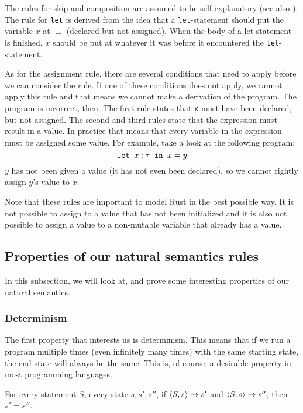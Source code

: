 The rules for skip and composition are assumed to be self-explanatory (see also \cite{nielson1992semantics}). The rule for \texttt{let} is derived from the idea that a \texttt{let}-statement should put the variable $x$ at $\perp$ (declared but not assigned). When the body of a let-statement is finished, $x$ should be put at whatever it was before it encountered the \texttt{let}-statement. 

As for the assignment rule, there are several conditions that need to apply before we can consider the rule. If one of these conditions does not apply, we cannot apply this rule and that means we cannot make a derivation of the program. The program is incorrect, then. The first rule states that \verb|x| must have been declared, but not assigned. The second and third rules state that the expression must result in a value. In practice that means that every variable in the expression must be assigned some value. 
For example, take a look at the following program:
$$\texttt{let }x : \tau \texttt{ in } x=y$$ 
$y$ has not been given a value (it has not even been declared), so we cannot rightly assign $y$'s value to $x$. 

Note that these rules are important to model Rust in the best possible way. It is not possible to assign to a value that has not been initialized and it is also not possible to assign a value to a non-mutable variable that already has a value. 

\subsection{Properties of our natural semantics rules}
In this subsection, we will look at, and prove some interesting properties of our natural semantics. 

\subsubsection*{Determinism}

The first property that interests us is determinism. This means that if we run a program multiple times (even infinitely many times) with the same starting state, the end state will always be the same. This is, of course, a desirable property in most programming languages.

\begin{theorem}
For every statement $S$, every state $s, s', s''$, if $\langle S, s \rangle \to s'$ and $\langle S, s \rangle \to s''$, then $s' = s''$.
\end{theorem}

